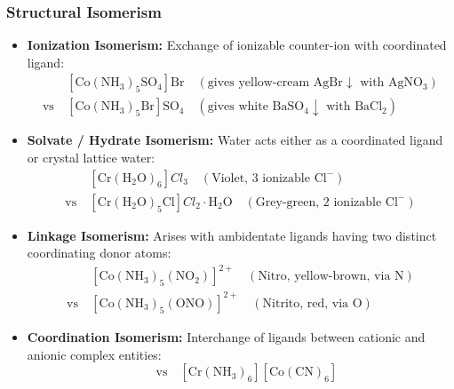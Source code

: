 \documentclass[10pt,twoside,openright]{book}
\begin{document}
\subsubsection{Structural Isomerism}
\begin{itemize}
  \item \textbf{Ionization Isomerism:} Exchange of ionizable counter-ion with coordinated ligand:
  \begin{align}
    &[\mathrm{Co(NH_3)_5SO_4}]\mathrm{Br} \quad (\text{gives yellow-cream } \mathrm{AgBr\downarrow} \text{ with } \mathrm{AgNO_3}) \\
    \text{vs}\ &[\mathrm{Co(NH_3)_5Br}]\mathrm{SO_4} \quad (\text{gives white } \mathrm{BaSO_4\downarrow} \text{ with } \mathrm{BaCl_2})
  \end{align}
  \item \textbf{Solvate / Hydrate Isomerism:} Water acts either as a coordinated ligand or crystal lattice water:
  \begin{align}
    &[\mathrm{Cr(H_2O)_6}]Cl_3 \quad (\text{Violet, 3 ionizable } \mathrm{Cl^-}) \\
    \text{vs}\ &[\mathrm{Cr(H_2O)_5Cl}]Cl_2\cdot \mathrm{H_2O} \quad (\text{Grey-green, 2 ionizable } \mathrm{Cl^-})
  \end{align}
  \item \textbf{Linkage Isomerism:} Arises with ambidentate ligands having two distinct coordinating donor atoms:
  \begin{align}
    &[\mathrm{Co(NH_3)_5(NO_2)}]^{2+} \quad (\text{Nitro, yellow-brown, via N}) \\
    \text{vs}\ &[\mathrm{Co(NH_3)_5(ONO)}]^{2+} \quad (\text{Nitrito, red, via O})
  \end{align}
  \item \textbf{Coordination Isomerism:} Interchange of ligands between cationic and anionic complex entities:
  \begin{equation}
    [\mathrm{Co(NH_3)_6}][\mathrm{Cr(CN)_6}] \quad \text{vs} \quad [\mathrm{Cr(NH_3)_6}][\mathrm{Co(CN)_6}]
  \end{equation}
\end{itemize}
\end{document}
